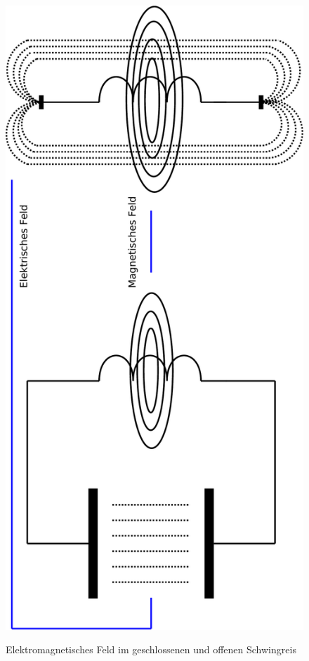 \begin{frame}
  \centering
  \begin{figure}
    \includegraphics[width=\textwidth,height=1.5\textheight,keepaspectratio,angle=270]{e08/AntSchwingkreis-crop.pdf}\\[1em]
    \caption{Elektromagnetisches Feld im geschlossenen und offenen Schwingreis}
  \end{figure}
\end{frame}

